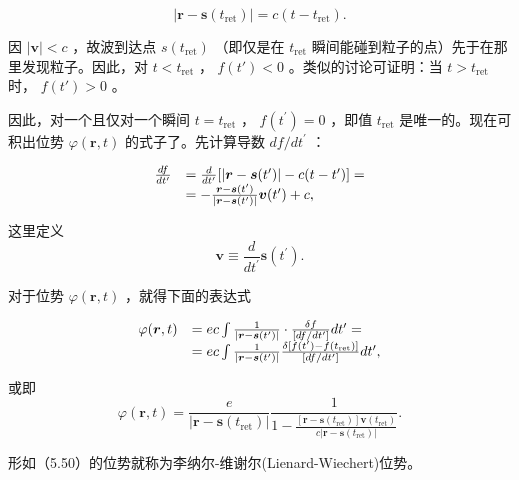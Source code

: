 \begin{equation*}
\left| \boldsymbol {r} - \boldsymbol {s} \left(t _ {\text {ret}}\right) \right| = c \left(t - t _ {\text {ret}}\right).\tag{5.49}
\end{equation*}

因 $|\boldsymbol {v}| < c$ ，故波到达点 $s(t_{\text{ret}})$ （即仅是在 $t_{\text{ret}}$ 瞬间能碰到粒子的点）先于在那里发现粒子。因此，对 $t < t_{\text{ret}}$ ， $f(t') < 0$ 。类似的讨论可证明：当 $t > t_{\text{ret}}$ 时， $f(t') > 0$ 。

因此，对一个且仅对一个瞬间 $t = t_{\mathrm{ret}}$ ， $f(t^{\prime}) = 0$ ，即值 $t_{\mathrm{ret}}$ 是唯一的。现在可积出位势 $\varphi (\pmb {r},t)$ 的式子了。先计算导数 $df / dt^{\prime}$ ：

\begin{equation*}
\begin{array}{r l} \frac {d f}{d t ^ {\prime}} & = \frac {d}{d t ^ {\prime}} [ | \boldsymbol {r} - \boldsymbol {s} (t ^ {\prime}) | - c (t - t ^ {\prime}) ] = \\ & = - \frac {\boldsymbol {r} - \boldsymbol {s} (t ^ {\prime})}{| \boldsymbol {r} - \boldsymbol {s} (t ^ {\prime}) |} \boldsymbol {v} (t ^ {\prime}) + c, \end{array}
\end{equation*}

这里定义
\begin{equation*}
\boldsymbol {v} \equiv \frac {d}{d t ^ {\prime}} \mathbf {s} (t ^ {\prime}).
\end{equation*}

对于位势 $\varphi(\boldsymbol{r},t)$ ，就得下面的表达式

\begin{equation*}
\begin{array}{r l} \varphi (\boldsymbol {r}, t) & = e c \int \frac {1}{| \boldsymbol {r} - \boldsymbol {s} (t ^ {\prime}) |} \cdot \frac {\delta f}{[ d f / d t ^ {\prime} ]} d t ^ {\prime} = \\ & = e c \int \frac {1}{| \boldsymbol {r} - \boldsymbol {s} (t ^ {\prime}) |} \frac {\delta [ f (t ^ {\prime}) - f (t _ {\rm ret}) ]}{[ d f / d t ^ {\prime} ]} d t ^ {\prime}, \end{array}
\end{equation*}

或即
\begin{equation*}
\varphi (\boldsymbol {r}, t) = \frac {e}{| \boldsymbol {r} - \mathbf {s} (t _ {\text {ret}}) |} \frac {1}{1 - \frac {[ \boldsymbol {r} - \mathbf {s} (t _ {\text {ret}}) ] \boldsymbol {v} (t _ {\text {ret}})}{c | \boldsymbol {r} - \mathbf {s} (t _ {\text {ret}}) |}}.\tag{5.50}
\end{equation*}

形如（5.50）的位势就称为李纳尔-维谢尔(Lienard-Wiechert)位势。
